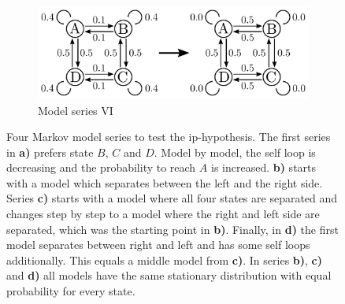 \begin{figure}[p]
\begin{subfigure}{0.85\textwidth}
        \includegraphics[width=\textwidth]{results/mc6_models}
        \vspace{-25pt}
        \caption{Model series VI}
        \label{fig:mc6-models}
    \end{subfigure}
    \caption[Four Markov model series to test the IP-hypothesis]{Four Markov model series to test the \acs{ip}-hypothesis. The first series in \textbf{a)} prefers state $B$, $C$ and $D$. Model by model, the self loop is decreasing and the probability to reach $A$ is increased. \textbf{b)} starts with a model which separates between the left and the right side. Series \textbf{c)} starts with a model where all four states are separated and changes step by step to a model where the right and left side are separated, which was the starting point in \textbf{b)}. Finally, in \textbf{d)} the first model separates between right and left and has some self loops additionally. This equals a middle model from \textbf{c)}. In series \textbf{b)}, \textbf{c)} and \textbf{d)} all models have the same stationary distribution with equal probability for every state.}
    \label{fig:mc-models-collection}
\end{figure}

